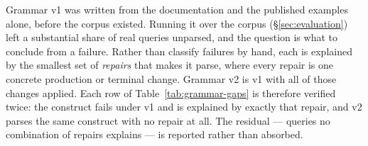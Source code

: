 \begin{remark}\label{rem:inference-table}
Grammar v1 was written from the documentation and the published examples alone, before
the corpus existed. Running it over the corpus (\S\ref{sec:evaluation}) left a
substantial share of real queries unparsed, and the question is what to conclude from a
failure. Rather than classify failures by hand, each is explained by the smallest set of
\emph{repairs} that makes it parse, where every repair is one concrete production or
terminal change. Grammar v2 is v1 with all of those changes applied. Each row of
Table~\ref{tab:grammar-gaps} is therefore verified twice: the construct fails under v1
and is explained by exactly that repair, and v2 parses the same construct with no repair
at all. The residual --- queries no combination of repairs explains --- is reported
rather than absorbed.

\begin{table}[htbp]\centering\scriptsize

\caption{Constructs the documentation-derived grammar v1 was missing, with the number of
distinct corpus queries that need each. Every row is a production in v2.}
\label{tab:grammar-gaps}
\end{table}
\end{remark}
